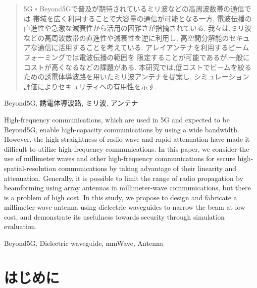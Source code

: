 \documentclass[technicalreport]{ieicej}
\begin{document}
\begin{abstract}
  5G・Beyond5Gで普及が期待されているミリ波などの高周波数帯の通信では
  帯域を広く利用することで大容量の通信が可能となる一方,
  電波伝播の直進性や急激な減衰性から活用の困難さが指摘されている.
  我々は,ミリ波などの高周波数帯の直進性や減衰性を逆に利用し,
  高空間分解能のセキュアな通信に活用することを考えている.
  アレイアンテナを利用するビームフォーミングでは電波伝播の範囲を
  限定することが可能であるが,一般にコストが高くなるなどの課題がある.
  本研究では,低コストでビームを絞るための誘電体導波路を用いたミリ波アンテナを提案し,
  シミュレーション評価によりセキュリティへの有用性を示す.
\end{abstract}
\begin{keyword}
Beyond5G, 誘電体導波路, ミリ波, アンテナ
\end{keyword}
\begin{eabstract}
High-frequency communications,
which are used in 5G and expected to be Beyond5G,
enable high-capacity communications by using a wide bandwidth.
However, the high straightness of radio wave
and rapid attenuation
have made it difficult to utilize high-frequency communications.
In this paper, we consider the use of millimeter waves and
other high-frequency communications for secure high-spatial-resolution communications
by taking advantage of their linearity and attenuation.
Generally, it is possible to limit the range of radio propagation by
beamforming using array antennas in millimeter-wave communications,
but there is a problem of high cost.
In this study,
we propose to design and fabricate a millimeter-wave antenna using
dielectric waveguides to narrow the beam at low cost,
and demonstrate its usefulness towards security through simulation evaluation.
\end{eabstract}
\begin{ekeyword}
Beyond5G, Dielectric waveguide, mmWave, Antenna
\end{ekeyword}
\maketitle

\section{はじめに}
\end{document}
